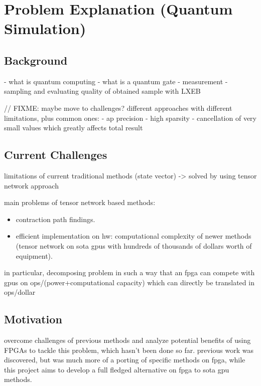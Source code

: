 \documentclass[12pt,oneside,a4paper]{article}
\begin{document}
\section{Problem Explanation (Quantum Simulation)}

\subsection{Background}
- what is quantum computing
- what is a quantum gate
- measurement
- sampling and evaluating quality of obtained sample with LXEB

// FIXME: maybe move to challenges?
different approaches with different limitations, plus common ones:
- ap precision
- high sparsity
- cancellation of very small values which greatly affects total result

\subsection{Current Challenges}
limitations of current traditional methods (state vector) -> solved by using tensor network approach



main problems of tensor network based methods:
\begin{itemize}
	\item contraction path findings.
	\item efficient implementation on hw: computational complexity of newer methods (tensor network on sota gpus with hundreds of thousands of dollars worth of equipment).
\end{itemize}

in particular, decomposing problem in such a way that an fpga can compete with gpus on ops/(power+computational capacity) which can directly be translated in ops/dollar

\subsection{Motivation}
overcome challenges of previous methods and analyze potential benefits of using FPGAs to tackle this problem, which hasn't been done so far. previous work was discovered, but was much more of a porting of specific methods on fpga, while this project aims to develop a full fledged alternative on fpga to sota gpu methods.
\end{document}
